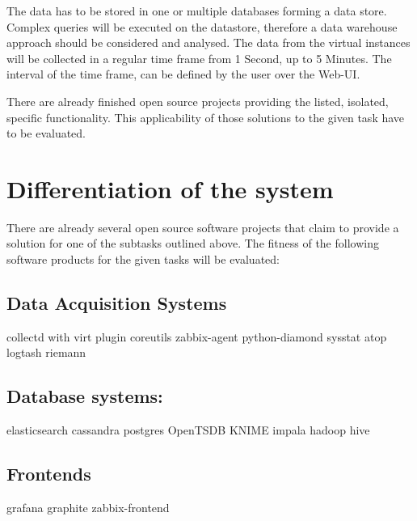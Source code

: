 The data has to be stored in one or multiple databases forming a data store.
Complex queries will be executed on the datastore, therefore a data warehouse
approach should be considered and analysed. The data from the virtual instances
will be collected in a regular time frame from 1 Second, up to 5 Minutes. The
interval of the time frame, can be defined by the user over the Web-UI.

There are already finished open source projects providing the listed, isolated,
specific functionality. This applicability of those solutions to the given task
have to be evaluated.

\section{Differentiation of the system}

There are already several open source software projects that claim to provide a
solution for one of the subtasks outlined above. The fitness of the following
software products for the given tasks will be evaluated:

\subsection{Data Acquisition Systems}

\begin{outline}
    \1 collectd with virt plugin
    \1 coreutils
    \1 zabbix-agent
    \1 python-diamond
    \1 sysstat
    \1 atop
    \1 logtash
    \1 riemann
\end{outline}

\subsection{Database systems:}

\begin{outline}
    \1 elasticsearch
    \1 cassandra
    \1 postgres
    \1 OpenTSDB
    \1 KNIME
    \1 impala
    \1 hadoop
    \1 hive
\end{outline}

\subsection{Frontends}

\begin{outline}
    \1 grafana
    \1 graphite
    \1 zabbix-frontend
\end{outline}


